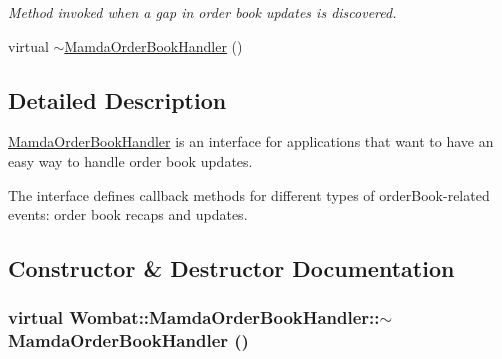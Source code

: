 \begin{CompactItemize}
\begin{CompactList}\small\item\em Method invoked when a gap in order book updates is discovered. \item\end{CompactList}\item 
virtual \hyperlink{classWombat_1_1MamdaOrderBookHandler_073056a5996cc2e19d4dbe06eab79193}{$\sim$Mamda\-Order\-Book\-Handler} ()
\end{CompactItemize}


\subsection{Detailed Description}
\hyperlink{classWombat_1_1MamdaOrderBookHandler}{Mamda\-Order\-Book\-Handler} is an interface for applications that want to have an easy way to handle order book updates. 

The interface defines callback methods for different types of order\-Book-related events: order book recaps and updates. 



\subsection{Constructor \& Destructor Documentation}
\hypertarget{classWombat_1_1MamdaOrderBookHandler_073056a5996cc2e19d4dbe06eab79193}{
\subsubsection[$\sim$MamdaOrderBookHandler]{\setlength{\rightskip}{0pt plus 5cm}virtual Wombat::Mamda\-Order\-Book\-Handler::$\sim$Mamda\-Order\-Book\-Handler ()}}
\label{classWombat_1_1MamdaOrderBookHandler_073056a5996cc2e19d4dbe06eab79193}




